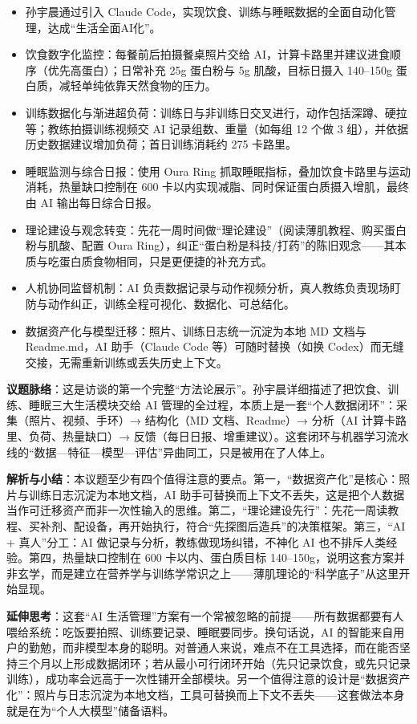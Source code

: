\begin{itemize}
\tightlist
\item
  孙宇晨通过引入 Claude
  Code，实现饮食、训练与睡眠数据的全面自动化管理，达成``生活全面AI化''。
\item
  饮食数字化监控：每餐前后拍摄餐桌照片交给
  AI，计算卡路里并建议进食顺序（优先高蛋白）；日常补充 25g 蛋白粉与 5g
  肌酸，目标日摄入 140--150g 蛋白质，减轻单纯依靠天然食物的压力。
\item
  训练数据化与渐进超负荷：训练日与非训练日交叉进行，动作包括深蹲、硬拉等；教练拍摄训练视频交
  AI 记录组数、重量（如每组 12 个做 3
  组），并依据历史数据建议增加负荷；首日训练消耗约 275 卡路里。
\item
  睡眠监测与综合日报：使用 Oura Ring
  抓取睡眠指标，叠加饮食卡路里与运动消耗，热量缺口控制在 600
  卡以内实现减脂、同时保证蛋白质摄入增肌，最终由 AI 输出每日综合日报。
\item
  理论建设与观念转变：先花一周时间做``理论建设''（阅读薄肌教程、购买蛋白粉与肌酸、配置
  Oura
  Ring），纠正``蛋白粉是科技/打药''的陈旧观念------其本质与吃蛋白质食物相同，只是更便捷的补充方式。
\item
  人机协同监督机制：AI
  负责数据记录与动作视频分析，真人教练负责现场盯防与动作纠正，训练全程可视化、数据化、可总结化。
\item
  数据资产化与模型迁移：照片、训练日志统一沉淀为本地 MD 文档与
  Readme.md，AI 助手（Claude Code 等）可随时替换（如换
  Codex）而无缝交接，无需重新训练或丢失历史上下文。
\end{itemize}

\textbf{议题脉络}：这是访谈的第一个完整``方法论展示''。孙宇晨详细描述了把饮食、训练、睡眠三大生活模块交给
AI 管理的全过程，本质上是一套``个人数据闭环''：采集（照片、视频、手环）→
结构化（MD 文档、Readme）→ 分析（AI 计算卡路里、负荷、热量缺口）→
反馈（每日日报、增重建议）。这套闭环与机器学习流水线的``数据---特征---模型---评估''异曲同工，只是被用在了人体上。

\textbf{解析与小结}：本议题至少有四个值得注意的要点。第一，``数据资产化''是核心：照片与训练日志沉淀为本地文档，AI
助手可替换而上下文不丢失，这是把个人数据当作可迁移资产而非一次性输入的思维。第二，``理论建设先行''：先花一周读教程、买补剂、配设备，再开始执行，符合``先探图后造兵''的决策框架。第三，``AI
+ 真人''分工：AI 做记录与分析，教练做现场纠错，不神化 AI
也不排斥人类经验。第四，热量缺口控制在 600 卡以内、蛋白质目标
140--150g，说明这套方案并非玄学，而是建立在营养学与训练学常识之上------薄肌理论的``科学底子''从这里开始显现。

\textbf{延伸思考}：这套``AI
生活管理''方案有一个常被忽略的前提------所有数据都要有人喂给系统：吃饭要拍照、训练要记录、睡眠要同步。换句话说，AI
的智能来自用户的勤勉，而非模型本身的聪明。对普通人来说，难点不在工具选择，而在能否坚持三个月以上形成数据闭环；若从最小可行闭环开始（先只记录饮食，或先只记录训练），成功率会远高于一次性铺开全部模块。另一个值得注意的设计是``数据资产化''：照片与日志沉淀为本地文档，工具可替换而上下文不丢失------这套做法本身就是在为``个人大模型''储备语料。

